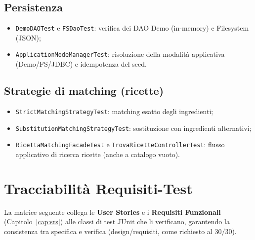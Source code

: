 \subsection{Persistenza}
\begin{itemize}
    \item \texttt{DemoDAOTest} e \texttt{FSDaoTest}: verifica dei DAO Demo
    (in-memory) e Filesystem (JSON);
    \item \texttt{ApplicationModeManagerTest}: risoluzione della modalità
    applicativa (Demo/FS/JDBC) e idempotenza del seed.
\end{itemize}

\subsection{Strategie di matching (ricette)}
\begin{itemize}
    \item \texttt{StrictMatchingStrategyTest}: matching esatto degli
    ingredienti;
    \item \texttt{SubstitutionMatchingStrategyTest}: sostituzione con
    ingredienti alternativi;
    \item \texttt{RicettaMatchingFacadeTest} e \texttt{TrovaRicetteControllerTest}:
    flusso applicativo di ricerca ricette (anche a catalogo vuoto).
\end{itemize}

\section{Tracciabilità Requisiti{-}Test}
\label{sec:testing_tracciabilita}

La matrice seguente collega le \textbf{User Stories} e i \textbf{Requisiti
Funzionali} (Capitolo~\ref{cap:srs}) alle classi di test JUnit che li
verificano, garantendo la consistenza tra specifica e verifica
(design/requisiti, come richiesto al 30/30).

